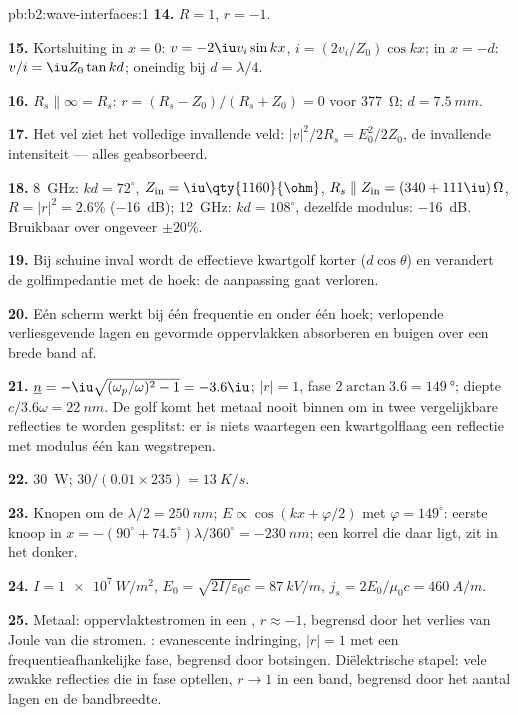 \begin{solution}{pb:b2:wave-interfaces:1}
\textbf{14.} $R = 1$, $r = -1$.

\textbf{15.} Kortsluiting in $x = 0$: $v = -2\iu v_i\sin kx$,
$i = (2v_i/Z_0)\cos kx$; in $x = -d$: $v/i = \iu Z_0\tan kd$; oneindig bij
$d = \lambda/4$.

\textbf{16.} $R_s \parallel \infty = R_s$: $r = (R_s - Z_0)/(R_s + Z_0) = 0$
voor \qty{377}{\ohm}; $d = \qty{7.5}{mm}$.

\textbf{17.} Het vel ziet het volledige invallende veld:
$|v|^2/2R_s =
E_0^2/2Z_0$, de invallende intensiteit --- alles geabsorbeerd.

\textbf{18.} \qty{8}{GHz}: $kd = 72^\circ$,
$Z_{\text{in}} = \iu\qty{1160}{\ohm}$,
$R_s \parallel
Z_{\text{in}} = (340 + 111\iu)\,\Omega$, $R = |r|^2 = 2.6\%$
(\qty{-16}{dB}); \qty{12}{GHz}: $kd = 108^\circ$, dezelfde modulus:
\qty{-16}{dB}. Bruikbaar over ongeveer $\pm20\%$.

\textbf{19.} Bij schuine inval wordt de effectieve kwartgolf korter
($d\cos\theta$) en verandert de golfimpedantie met de hoek: de aanpassing
gaat verloren.

\textbf{20.} Eén scherm werkt bij één frequentie en onder één hoek;
verlopende verliesgevende lagen en gevormde oppervlakken absorberen en
buigen over een brede band af.

\textbf{21.} $\underline n = -\iu\sqrt{(\omega_p/\omega)^2 - 1} = -3.6\iu$;
$|r| = 1$, fase $2\arctan3.6 = \qty{149}{\degree}$; diepte
$c/3.6\omega = \qty{22}{nm}$. De golf komt het metaal nooit binnen om in
twee vergelijkbare reflecties te worden gesplitst: er is niets waartegen een
kwartgolflaag een reflectie met modulus één kan wegstrepen.

\textbf{22.} \qty{30}{W}; $30/(0.01 \times 235) = \qty{13}{K/s}$.

\textbf{23.} Knopen om de $\lambda/2 = \qty{250}{nm}$;
$E \propto \cos(kx + \varphi/2)$ met $\varphi =
149^\circ$: eerste knoop in
$x = -(90^\circ + 74.5^\circ)\lambda/360^\circ = \qty{-230}{nm}$; een korrel
die daar ligt, zit in het donker.

\textbf{24.} $I = \qty{1e7}{W/m^2}$,
$E_0 = \sqrt{2I/\varepsilon_0c} = \qty{87}{kV/m}$,
$j_s =
2E_0/\mu_0c = \qty{460}{A/m}$.

\textbf{25.} Metaal: oppervlaktestromen in een ,
$r \approx -1$, begrensd door het verlies van Joule van die stromen. :
evanescente indringing, $|r| = 1$ met een frequentieafhankelijke fase,
begrensd door botsingen. Diëlektrische stapel: vele zwakke reflecties die in
fase optellen, $r \to 1$ in een band, begrensd door het aantal lagen en de
bandbreedte.
\end{solution}
